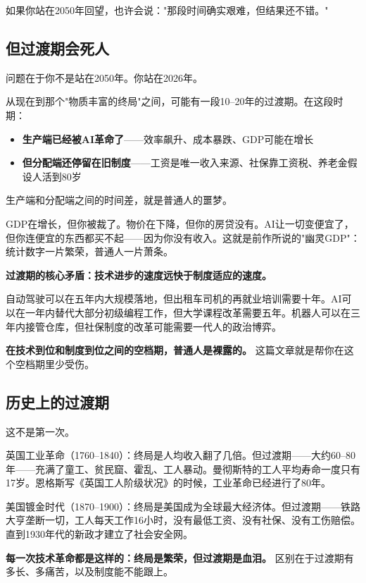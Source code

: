 \documentclass[a4paper,12pt,UTF8]{ctexart}
\begin{document}
如果你站在2050年回望，也许会说："那段时间确实艰难，但结果还不错。"

\subsection{但过渡期会死人}

问题在于你不是站在2050年。你站在2026年。

从现在到那个"物质丰富的终局"之间，可能有一段10--20年的过渡期。在这段时期：

\begin{itemize}
\item \textbf{生产端已经被AI革命了}——效率飙升、成本暴跌、GDP可能在增长
\item \textbf{但分配端还停留在旧制度}——工资是唯一收入来源、社保靠工资税、养老金假设人活到80岁
\end{itemize}

生产端和分配端之间的时间差，就是普通人的噩梦。

GDP在增长，但你被裁了。物价在下降，但你的房贷没有。AI让一切变便宜了，但你连便宜的东西都买不起——因为你没有收入。这就是前作所说的"幽灵GDP"：统计数字一片繁荣，普通人一片萧条。

\textbf{过渡期的核心矛盾：技术进步的速度远快于制度适应的速度。}

自动驾驶可以在五年内大规模落地，但出租车司机的再就业培训需要十年。AI可以在一年内替代大部分初级编程工作，但大学课程改革需要五年。机器人可以在三年内接管仓库，但社保制度的改革可能需要一代人的政治博弈。

\textbf{在技术到位和制度到位之间的空档期，普通人是裸露的。} 这篇文章就是帮你在这个空档期里少受伤。

\subsection{历史上的过渡期}

这不是第一次。

英国工业革命（1760--1840）：终局是人均收入翻了几倍。但过渡期——大约60--80年——充满了童工、贫民窟、霍乱、工人暴动。曼彻斯特的工人平均寿命一度只有17岁。恩格斯写《英国工人阶级状况》的时候，工业革命已经进行了80年。

美国镀金时代（1870--1900）：终局是美国成为全球最大经济体。但过渡期——铁路大亨垄断一切，工人每天工作16小时，没有最低工资、没有社保、没有工伤赔偿。直到1930年代的新政才建立了社会安全网。

\textbf{每一次技术革命都是这样的：终局是繁荣，但过渡期是血泪。} 区别在于过渡期有多长、多痛苦，以及制度能不能跟上。
\end{document}
